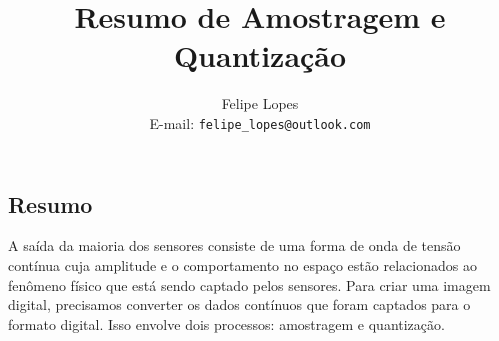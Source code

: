 \documentclass[a4paper,11pt]{article}
\title{Resumo de Amostragem e Quantização}
\author{Felipe Lopes\\E-mail: {\tt felipe\_lopes@outlook.com}}
\date{}
\begin{document}
\graphicspath{ {imgResumo/} }
\maketitle

\begin{multicols}{2}
\section{Resumo}
A saída da maioria dos sensores consiste de uma forma de onda de tensão contínua cuja amplitude e o comportamento no espaço estão relacionados ao fenômeno físico que está sendo captado pelos sensores. Para criar uma imagem digital, precisamos converter os dados contínuos que foram captados para o formato digital. Isso envolve dois processos: amostragem e quantização.


\end{multicols}
\end{document}

